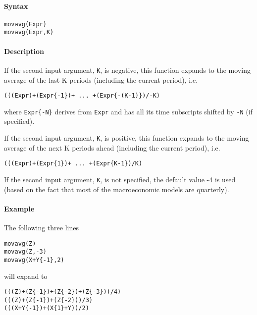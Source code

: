 


	\paragraph{Syntax}

\begin{verbatim}
movavg(Expr)
movavg(Expr,K)
\end{verbatim}

\paragraph{Description}

If the second input argument, \texttt{K}, is negative, this function
expands to the moving average of the last K periods (including the
current period), i.e.

\begin{verbatim}
(((Expr)+(Expr{-1})+ ... +(Expr{-(K-1)})/-K)
\end{verbatim}

where \texttt{Expr\{-N\}} derives from \texttt{Expr} and has all its
time subscripts shifted by \texttt{-N} (if specified).

If the second input argument, \texttt{K}, is positive, this function
expands to the moving average of the next K periods ahead (including the
current period), i.e.

\begin{verbatim}
(((Expr)+(Expr{1})+ ... +(Expr{K-1})/K)
\end{verbatim}

If the second input argument, \texttt{K}, is not specified, the default
value -4 is used (based on the fact that most of the macroeconomic
models are quarterly).

\paragraph{Example}

The following three lines

\begin{verbatim}
movavg(Z)
movavg(Z,-3)
movavg(X+Y{-1},2)
\end{verbatim}

will expand to

\begin{verbatim}
(((Z)+(Z{-1})+(Z{-2})+(Z{-3}))/4)
(((Z)+(Z{-1})+(Z{-2}))/3)
(((X+Y{-1})+(X{1}+Y))/2)
\end{verbatim}


